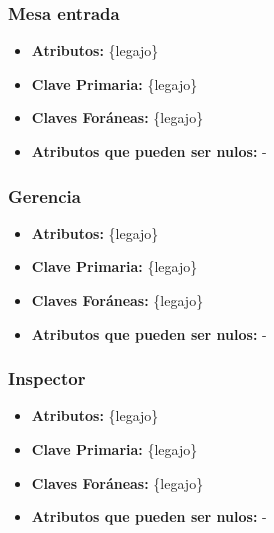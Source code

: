 \documentclass[a4paper,11pt]{article}
\begin{document}
\subsubsection{Mesa entrada}

\begin{itemize}

	\item \textbf{Atributos:} \{legajo\}
	
	\item \textbf{Clave Primaria:} \{legajo\}
	
	\item \textbf{Claves Foráneas:} \{legajo\}
	
	\item \textbf{Atributos que pueden ser nulos:} -
	
\end{itemize}

\subsubsection{Gerencia}

\begin{itemize}

	\item \textbf{Atributos:} \{legajo\}
	
	\item \textbf{Clave Primaria:} \{legajo\}
	
	\item \textbf{Claves Foráneas:} \{legajo\}
	
	\item \textbf{Atributos que pueden ser nulos:} -
	
\end{itemize}

\subsubsection{Inspector}

\begin{itemize}

	\item \textbf{Atributos:} \{legajo\}
	
	\item \textbf{Clave Primaria:} \{legajo\}
	
	\item \textbf{Claves Foráneas:} \{legajo\}
	
	\item \textbf{Atributos que pueden ser nulos:} -
	
\end{itemize}
\end{document}
